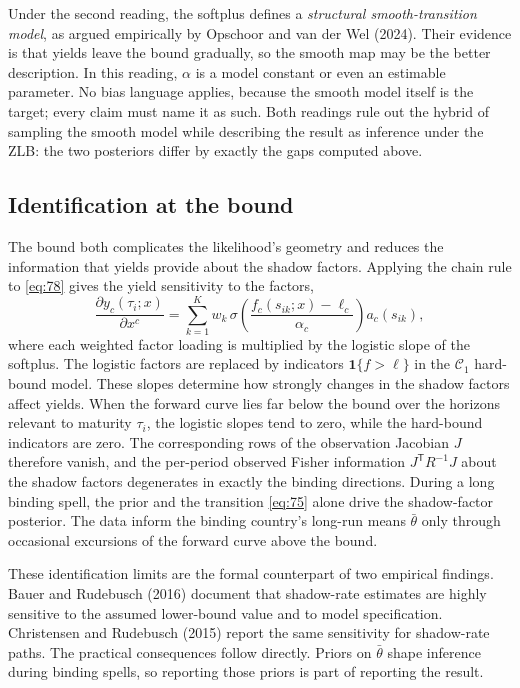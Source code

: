 \documentclass[11pt]{article}
\begin{document}
Under the second reading, the softplus defines a \emph{structural smooth-transition model}, as argued empirically by Opschoor and van der Wel (2024). Their evidence is that yields leave the bound gradually, so the smooth map may be the better description. In this reading, \(\alpha\) is a model constant or even an estimable parameter. No bias language applies, because the smooth model itself is the target; every claim must name it as such. Both readings rule out the hybrid of sampling the smooth model while describing the result as inference under the ZLB: the two posteriors differ by exactly the gaps computed above.

\subsection{Identification at the bound}
\label{sec:shadow-ident}

The bound both complicates the likelihood's geometry and reduces the information that yields provide about the shadow factors. Applying the chain rule to \eqref{eq:78} gives the yield sensitivity to the factors,
\begin{equation}\label{eq:92}
 \frac{\partial y_c(\tau_i;x)}{\partial x^c}
 =\sum_{k=1}^{K}w_k\,
 \sigma\!\left(\frac{f_c(s_{ik};x)-\ell_c}{\alpha_c}\right)
 a_c(s_{ik}),
\end{equation}
where each weighted factor loading is multiplied by the logistic slope of the softplus. The logistic factors are replaced by indicators \(\mathbf 1\{f>\ell\}\) in the \(\mathcal C_1\) hard-bound model. These slopes determine how strongly changes in the shadow factors affect yields. When the forward curve lies far below the bound over the horizons relevant to maturity \(\tau_i\), the logistic slopes tend to zero, while the hard-bound indicators are zero. The corresponding rows of the observation Jacobian \(J\) therefore vanish, and the per-period observed Fisher information \(J^{\mathsf T}R^{-1}J\) about the shadow factors degenerates in exactly the binding directions. During a long binding spell, the prior and the transition \eqref{eq:75} alone drive the shadow-factor posterior. The data inform the binding country's long-run means \(\bar\theta\) only through occasional excursions of the forward curve above the bound.

These identification limits are the formal counterpart of two empirical findings. Bauer and Rudebusch (2016) document that shadow-rate estimates are highly sensitive to the assumed lower-bound value and to model specification. Christensen and Rudebusch (2015) report the same sensitivity for shadow-rate paths. The practical consequences follow directly. Priors on \(\bar\theta\) shape inference during binding spells, so reporting those priors is part of reporting the result.
\end{document}
